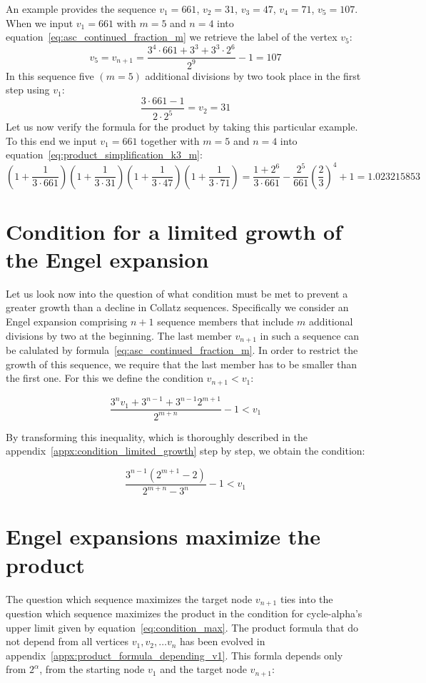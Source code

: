 \begin{example}
	An example provides the sequence $v_1=661$, $v_2=31$, $v_3=47$, $v_4=71$, $v_5=107$. When we input $v_1=661$ with $m=5$ and $n=4$ into equation~\ref{eq:asc_continued_fraction_m} we retrieve the label of the vertex $v_5$:
	\[
	v_5=v_{n+1}=\frac{3^4\cdot661+3^3+3^3\cdot2^6}{2^9}-1=107
	\]
	In this sequence five $(m=5)$ additional divisions by two took place in the first step using $v_1$:
	\[
	\frac{3\cdot661-1}{2\cdot2^5}=v_2=31
	\]
	Let us now verify the formula for the product by taking this particular example. To this end we input $v_1=661$ together with $m=5$ and $n=4$ into equation~\ref{eq:product_simplification_k3_m}:
	\[
	\left(1+\frac{1}{3\cdot661}\right)\left(1+\frac{1}{3\cdot31}\right)\left(1+\frac{1}{3\cdot47}\right)\left(1+\frac{1}{3\cdot71}\right)=\frac{1+2^{6}}{3\cdot661}-\frac{2^5}{661}\left(\frac{2}{3}\right)^4+1=1.023215853
	\]
\end{example}

\section{Condition for a limited growth of the Engel expansion}
\label{sec:condition_limited_growth}
Let us look now into the question of what condition must be met to prevent a greater growth than a decline in Collatz sequences. Specifically we consider an Engel expansion comprising $n+1$ sequence members that include $m$ additional divisions by two at the beginning. The last member $v_{n+1}$ in such a sequence can be calulated by formula~\ref{eq:asc_continued_fraction_m}. In order to restrict the growth of this sequence, we require that the last member has to be smaller than the first one. For this we define the condition $v_{n+1}<v_1$:

\[
\frac{3^nv_1+3^{n-1}+3^{n-1}2^{m+1}}{2^{m+n}}-1<v_1
\]

By transforming this inequality, which is thoroughly described in the appendix~\ref{appx:condition_limited_growth} step by step, we obtain the condition:

\begin{equation}
	\label{eq:condition_limited_growth}
	\frac{3^{n-1}\left(2^{m+1}-2\right)}{2^{m+n}-3^n}-1<v_1
\end{equation}

\section{Engel expansions maximize the product}
The question which sequence maximizes the target node $v_{n+1}$ ties into the question which sequence maximizes the product in the condition for cycle-alpha's upper limit given by equation~\ref{eq:condition_max}. The product formula that do not depend from all vertices $v_1,v_2,\ldots v_n$ has been evolved in appendix~\ref{appx:product_formula_depending_v1}. This formla depends only from $2^\alpha$, from the starting node $v_1$ and the target node $v_{n+1}$:

